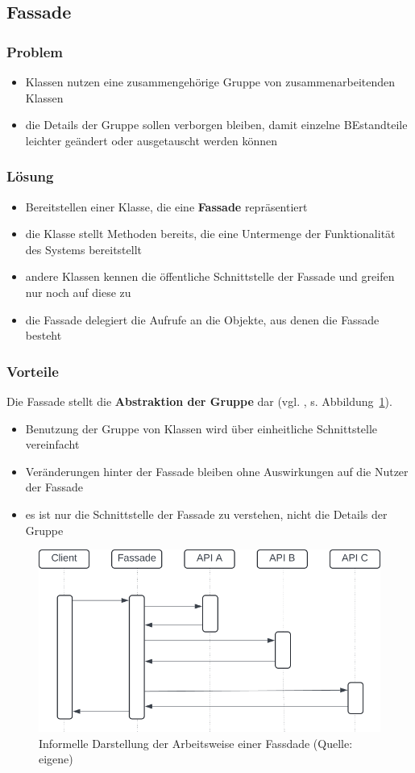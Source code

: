 \subsection{Fassade}

\subsubsection*{Problem}
\begin{itemize}
    \item Klassen nutzen eine zusammengehörige Gruppe von zusammenarbeitenden Klassen
    \item die Details der Gruppe sollen verborgen bleiben, damit einzelne BEstandteile leichter geändert oder ausgetauscht werden können
\end{itemize}

\subsubsection*{Lösung}
\begin{itemize}
    \item Bereitstellen einer Klasse, die eine \textbf{Fassade} repräsentiert
    \item die Klasse stellt Methoden bereits, die eine Untermenge der Funktionalität des Systems bereitstellt
    \item andere Klassen kennen die öffentliche Schnittstelle der Fassade und greifen nur noch auf diese zu
    \item die Fassade delegiert die Aufrufe an die Objekte, aus denen die Fassade besteht
\end{itemize}

\subsubsection*{Vorteile}
Die Fassade stellt die \textbf{Abstraktion der Gruppe} dar (vgl. \cite[61]{Wed09b}, s. Abbildung~\ref{fig:fassade}).

\begin{itemize}
    \item Benutzung der Gruppe von Klassen wird über einheitliche Schnittstelle vereinfacht
    \item Veränderungen hinter der Fassade bleiben ohne Auswirkungen auf die Nutzer der Fassade
    \item es ist nur die Schnittstelle der Fassade zu verstehen, nicht die Details der Gruppe
\end{itemize}

\begin{figure}
    \centering
    \includegraphics[scale=0.4]{part two/Objektorientierter Entwurf/img/fassade}
    \caption{Informelle Darstellung der Arbeitsweise einer Fassdade (Quelle: eigene)}
    \label{fig:fassade}
\end{figure}
